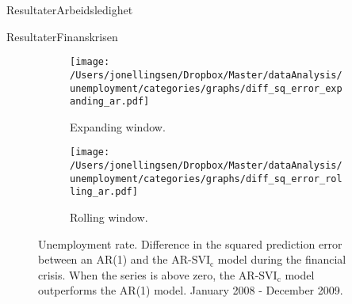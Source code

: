 \documentclass{beamer}
\begin{document}
\begin{frame}{Resultater}{Arbeidsledighet}
\end{frame}



\begin{frame}{Resultater}{Finanskrisen}
\begin{figure}[H]
    \begin{subfigure}[b]{0.45\textwidth}
\caption{Expanding window.}
\label{diff_sq_error_expanding_ar_urate}
        \texttt{[image: /Users/jonellingsen/Dropbox/Master/dataAnalysis/unemployment/categories/graphs/diff\_sq\_error\_expanding\_ar.pdf]}
    \end{subfigure}
\begin{subfigure}[b]{0.45\textwidth}
 \caption{Rolling window.}
\label{diff_sq_error_rolling_ar_urate}       
\texttt{[image: /Users/jonellingsen/Dropbox/Master/dataAnalysis/unemployment/categories/graphs/diff\_sq\_error\_rolling\_ar.pdf]}
    \end{subfigure}\hfill
\caption{Unemployment rate. Difference in the squared prediction error between an AR(1) and the AR-$\text{SVI}_\text{c}$ model during the financial crisis. When the series is above zero, the AR-$\text{SVI}_\text{c}$ model outperforms the AR(1) model. January 2008 - December 2009.}
\end{figure}
\end{frame}
\end{document}
